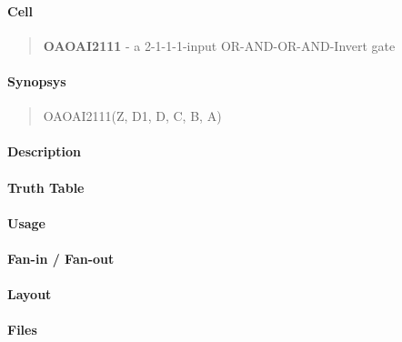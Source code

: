 \label{OAOAI2111}
\paragraph{Cell}
\begin{quote}
    \textbf{OAOAI2111} - a 2-1-1-1-input OR-AND-OR-AND-Invert gate
\end{quote}

\paragraph{Synopsys}
\begin{quote}
    OAOAI2111(Z, D1, D, C, B, A)
\end{quote}

\paragraph{Description}

%

\paragraph{Truth Table}
%

\paragraph{Usage}

\paragraph{Fan-in / Fan-out}

\paragraph{Layout}

\paragraph{Files}
